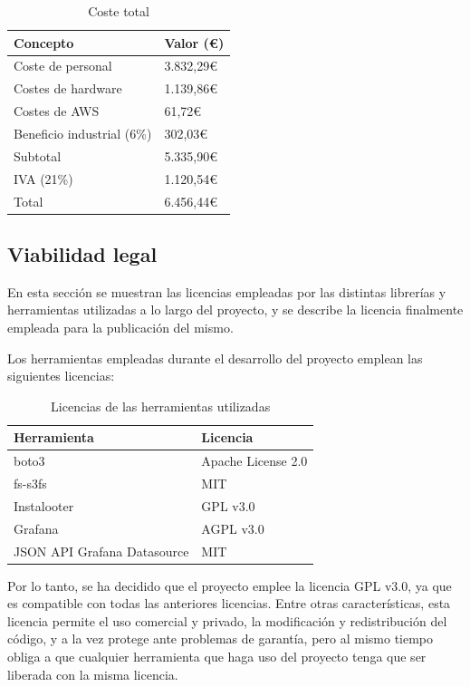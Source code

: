\begin{table}[H]
    \centering
    \begin{tabular}{ll}
    \hline
    \textbf{Concepto}           & \textbf{Valor (€)} \\ \hline
    Coste de personal           & 3.832,29€      \\
    Costes de hardware          & 1.139,86€ \\
    Costes de AWS               & 61,72€ \\ \hline
    Beneficio industrial (6\%)  & 302,03€ \\ \hline
    Subtotal                    & 5.335,90€ \\
    IVA (21\%)                  & 1.120,54€ \\ \hline
    Total                       & 6.456,44€ \\ \hline
    \end{tabular}
    \caption{Coste total}
    \label{tab:coste_total}
\end{table}

\subsection{Viabilidad legal}

En esta sección se muestran las licencias empleadas por las distintas librerías y herramientas utilizadas a lo largo del proyecto, y se describe la licencia finalmente empleada para la publicación del mismo.

Los herramientas empleadas durante el desarrollo del proyecto emplean las siguientes licencias:

\begin{table}[H]
    \centering
    \begin{tabular}{ll}
    \hline
    \textbf{Herramienta} & \textbf{Licencia} \\ \hline
    boto3 & Apache License 2.0 \\
    fs-s3fs & MIT \\
    Instalooter & GPL v3.0 \\
    Grafana & AGPL v3.0 \\
    JSON API Grafana Datasource & MIT \\ \hline
    \end{tabular}
    \caption{Licencias de las herramientas utilizadas}
    \label{tab:licencias}
\end{table}

Por lo tanto, se ha decidido que el proyecto emplee la licencia GPL v3.0, ya que es compatible con todas las anteriores licencias. Entre otras características, esta licencia permite el uso comercial y privado, la modificación y redistribución del código, y a la vez protege ante problemas de garantía, pero al mismo tiempo obliga a que cualquier herramienta que haga uso del proyecto tenga que ser liberada con la misma licencia.
